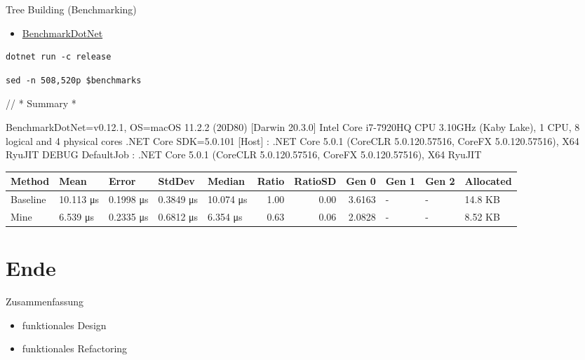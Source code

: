 \documentclass[t]{beamer}
\begin{document}
\begin{frame}[label={sec:org7a4fa1a},fragile]{Tree Building (Benchmarking)}
 \begin{itemize}
\item \href{https://github.com/dotnet/BenchmarkDotNet}{BenchmarkDotNet}
\end{itemize}

\begin{verbatim}
dotnet run -c release
\end{verbatim}

\begin{verbatim}
sed -n 508,520p $benchmarks
\end{verbatim}

\tiny
// * Summary *

BenchmarkDotNet=v0.12.1, OS=macOS 11.2.2 (20D80) [Darwin 20.3.0]
Intel Core i7-7920HQ CPU 3.10GHz (Kaby Lake), 1 CPU, 8 logical and 4 physical cores
.NET Core SDK=5.0.101
  [Host]     : .NET Core 5.0.1 (CoreCLR 5.0.120.57516, CoreFX 5.0.120.57516), X64 RyuJIT DEBUG
  DefaultJob : .NET Core 5.0.1 (CoreCLR 5.0.120.57516, CoreFX 5.0.120.57516), X64 RyuJIT


\begin{center}
\begin{tabular}{lllllrrrlll}
Method & Mean & Error & StdDev & Median & Ratio & RatioSD & Gen 0 & Gen 1 & Gen 2 & Allocated\\
\hline
Baseline & 10.113 μs & 0.1998 μs & 0.3849 μs & 10.074 μs & 1.00 & 0.00 & 3.6163 & - & - & 14.8 KB\\
Mine & 6.539 μs & 0.2335 μs & 0.6812 μs & 6.354 μs & 0.63 & 0.06 & 2.0828 & - & - & 8.52 KB\\
\end{tabular}
\end{center}
\end{frame}

\section{Ende }
\label{sec:org7f195f8}
\begin{frame}[label={sec:org4148e83}]{Zusammenfassung}
\begin{itemize}
\item funktionales Design
\item funktionales Refactoring
\end{itemize}
\end{frame}
\end{document}
